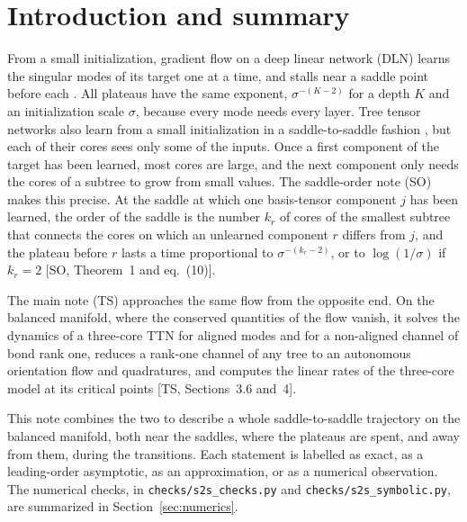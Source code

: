 \documentclass[11pt]{article}
\newcommand{\TS}{\textsf{TS}}
\newcommand{\SO}{\textsf{SO}}
\newcommand{\ts}[1]{[\TS, #1]}
\newcommand{\so}[1]{[\SO, #1]}
\theoremstyle{definition}
\numberwithin{equation}{section}
\begin{document}
\tableofcontents

\section{Introduction and summary}\label{sec:intro}

From a small initialization, gradient flow on a deep linear network (DLN) learns the singular modes of its target one at a time, and stalls near a saddle point before each \citep{saxe2014exact,jacot2021saddle}. All plateaus have the same exponent, $\sigma^{-(K-2)}$ for a depth $K$ and an initialization scale $\sigma$, because every mode needs every layer. Tree tensor networks also learn from a small initialization in a saddle-to-saddle fashion \citep{razin2022implicit,furman2026benign}, but each of their cores sees only some of the inputs. Once a first component of the target has been learned, most cores are large, and the next component only needs the cores of a subtree to grow from small values. The saddle-order note (\SO) makes this precise. At the saddle at which one basis-tensor component $j$ has been learned, the order of the saddle is the number $k_r$ of cores of the smallest subtree that connects the cores on which an unlearned component $r$ differs from $j$, and the plateau before $r$ lasts a time proportional to $\sigma^{-(k_r-2)}$, or to $\log(1/\sigma)$ if $k_r=2$ \so{Theorem~1 and eq.~(10)}.

The main note (\TS) approaches the same flow from the opposite end. On the balanced manifold, where the conserved quantities of the flow vanish, it solves the dynamics of a three-core TTN for aligned modes and for a non-aligned channel of bond rank one, reduces a rank-one channel of any tree to an autonomous orientation flow and quadratures, and computes the linear rates of the three-core model at its critical points \ts{Sections~3.6 and~4}.

This note combines the two to describe a whole saddle-to-saddle trajectory on the balanced manifold, both near the saddles, where the plateaus are spent, and away from them, during the transitions. Each statement is labelled as exact, as a leading-order asymptotic, as an approximation, or as a numerical observation. The numerical checks, in \texttt{checks/s2s\_checks.py} and \texttt{checks/s2s\_symbolic.py}, are summarized in Section~\ref{sec:numerics}.
\end{document}
